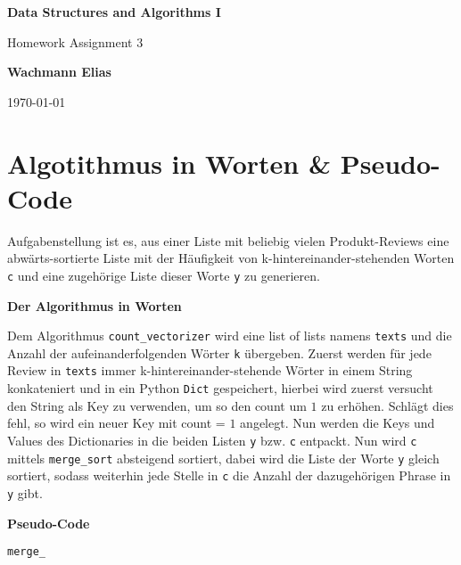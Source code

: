 \documentclass[ngerman]{scrartcl}
\newcommand{\code}{\texttt}
\begin{document}
\begin{titlepage}
    \begin{center}
        \vspace{1cm}
        \Huge
        \textbf{Data Structures and Algorithms I}
        \vspace{5mm}

        \Large
        Homework Assignment 3
        \vspace{5mm}


        \textbf{Wachmann Elias}


        \today
    \end{center}
\end{titlepage}

\clearpage
\tableofcontents
\newpage

\section{Algotithmus in Worten \& Pseudo-Code}
\label{sec:pseudo_code}
Aufgabenstellung ist es, aus einer Liste mit beliebig vielen Produkt-Reviews eine abwärts-sortierte Liste mit der Häufigkeit von k-hintereinander-stehenden Worten \code{c} und eine zugehörige Liste dieser Worte \code{y} zu generieren. 

\textbf{Der Algorithmus in Worten}

Dem Algorithmus \code{count\_vectorizer} wird eine list of lists namens \code{texts} und die Anzahl der aufeinanderfolgenden Wörter \code{k} übergeben.
Zuerst werden für jede Review in \code{texts} immer k-hintereinander-stehende Wörter in einem String konkateniert und in ein Python \code{Dict} gespeichert, hierbei wird zuerst versucht den String als Key zu verwenden, um so den count um $1$ zu erhöhen. Schlägt dies fehl, so wird ein neuer Key mit count = $1$ angelegt. Nun werden die Keys und Values des Dictionaries in die beiden Listen \code{y} bzw. \code{c} entpackt. Nun wird \code{c} mittels \code{merge\_sort} absteigend sortiert, dabei wird die Liste der Worte \code{y} gleich sortiert, sodass weiterhin jede Stelle in \code{c} die Anzahl der dazugehörigen Phrase in \code{y} gibt.

\textbf{Pseudo-Code}

\begin{algorithm}
\caption{\code{merge\_}}
\begin{algorithmic}[1]
    
    \EndFunction
\end{algorithmic}
\end{algorithm}
\end{document}
